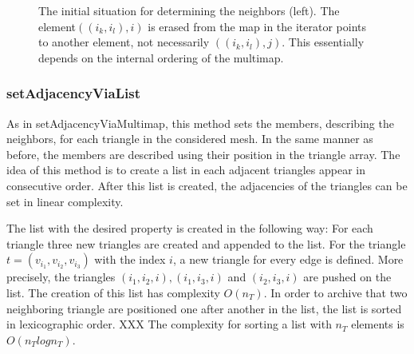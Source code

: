 \documentclass[10pt]{article}
\begin{document}
\begin{figure}[h]  
	\begin{minipage}{0.4\textwidth}
		
	\end{minipage}
	\hfill
	\begin{minipage}{0.4\textwidth}
		\vspace{1cm}
		
		
	\end{minipage}
	\caption{The initial situation for determining the neighbors (left). The element$ ((i_k,i_l),i) $ is erased from the map in the iterator points to another element, not necessarily $((i_k,i_l),j)$. This essentially depends on the internal ordering of the multimap.  }

\end{figure}


\subsubsection{setAdjacencyViaList} \label{list}
As in setAdjacencyViaMultimap, this method sets the members, describing the neighbors, for each triangle in the considered mesh. In the same manner as before, the members are described using their position in the triangle array. The idea of this method is to create a list in each adjacent triangles appear in consecutive order. After this list is created, the adjacencies of the triangles can be set in linear complexity.

The list with the desired property is created in the following way: For each triangle three new triangles are created and appended to the list. For the triangle $t = (v_{i_1},v_{i_2},v_{i_3})$ with the index $i$, a new triangle for every edge is defined. More precisely, the triangles $({i_1},{i_2},i), ({i_1},{i_3},i)$ and $({i_2},{i_3},i)$ are pushed on the list. The creation of this list has complexity $O(n_T)$. In order to archive that two neighboring triangle are positioned one after another in the list, the list is sorted in lexicographic order. XXX The complexity for sorting a list with $n_T$ elements is $O(n_Tlogn_T)$.
\end{document}
